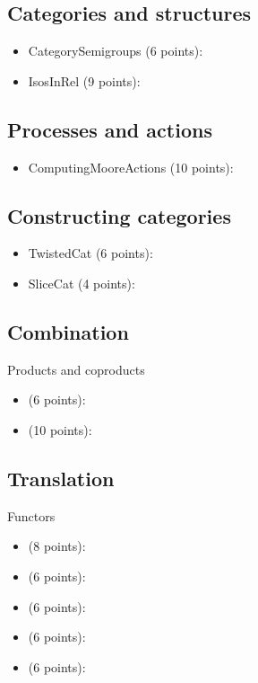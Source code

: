 \subsection{Categories and structures}
\begin{itemize}
    \item CategorySemigroups (6 points): 
    \item IsosInRel (9 points): 
\end{itemize}

\subsection{Processes and actions}
\begin{itemize}
    \item ComputingMooreActions (10 points): 
\end{itemize}

\subsection{Constructing categories}
\begin{itemize}
    \item TwistedCat (6 points): 
    \item SliceCat (4 points): 
\end{itemize}

\subsection{Combination}

Products and coproducts
\begin{itemize}
    \item {} (6 points): 
    \item {} (10 points): 
\end{itemize}

\subsection{Translation}

Functors
\begin{itemize}
    \item {} (8 points): 
    \item {} (6 points): 
    \item {} (6 points): 
    \item {} (6 points): 
    \item {} (6 points): 
\end{itemize}

